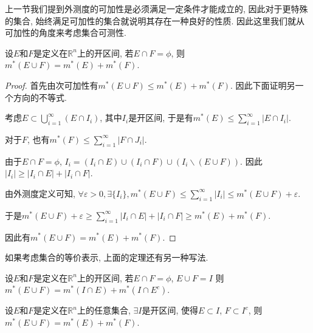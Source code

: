 \documentclass[theorem=false,mathfont=none,openany,sub3section]{easybook}
\begin{document}
上一节我们提到外测度的可加性是必须满足一定条件才能成立的, 因此对于更特殊的集合, 始终满足可加性的集合就说明其存在一种良好的性质. 因此这里我们就从可加性的角度来考虑集合可测性.\par

\begin{theorem}
  设$E$和$F$是定义在$\mathbb{R}^n$上的开区间, 若$E\cap F = \phi$, 则$m^{*}(E\cup F)= m^{*}(E)+m^{*}(F)$.\par
\end{theorem}

\begin{proof}
  首先由次可加性有$m^{*}(E\cup F)\leqslant m^{*}(E)+m^{*}(F)$. 因此下面证明另一个方向的不等式.\par
  考虑$E\subset \bigcup_{i=1}^{\infty}(E\cap I_i)$, 其中$I_i$是开区间, 于是有$m^{*}(E)\leqslant \sum_{i=1}^{\infty}|E\cap I_i|$.\par
  对于$F$, 也有$m^{*}(F)\leqslant \sum_{i=1}^{\infty}|F\cap J_i|$.\par
  由于$E\cap F = \phi$, $I_i=(I_i\cap E)\cup (I_i\cap F)\cup (I_i\backslash (E\cup F))$. 因此$|I_i|\geqslant |I_i\cap E|+|I_i\cap F|$.\par
  由外测度定义可知, $\forall \varepsilon >0, \exists \{I_i\}, m^{*}(E\cup F)\leqslant \sum_{i=1}^{\infty}|I_i|\leqslant m^{*}(E\cup F)+\varepsilon$.\par
  于是$m^{*}(E\cup F)+\varepsilon \geqslant \sum_{i=1}^{\infty}|I_i\cap E|+|I_i\cap F|\geqslant m^{*}(E)+m^{*}(F)$.\par
  因此有$m^{*}(E\cup F)= m^{*}(E)+m^{*}(F)$.\par
\end{proof}

\begin{remark}
  如果考虑集合的等价表示, 上面的定理还有另一种写法.\par
\end{remark}

\begin{corollary}
  设$E$和$F$是定义在$\mathbb{R}^n$上的开区间, 若$E\cap F = \phi$, $E\cup F=I$ 则$m^{*}(E\cup F)= m^{*}(I\cap E)+m^{*}(I\cap E^c)$.\par
\end{corollary}

\begin{corollary}
  设$E$和$F$是定义在$\mathbb{R}^n$上的任意集合, $\exists I$是开区间, 使得$E\subset I$, $F\subset I^c$, 则$m^{*}(E\cup F)= m^{*}(E)+m^{*}(F)$.\par
\end{corollary}
\end{document}

